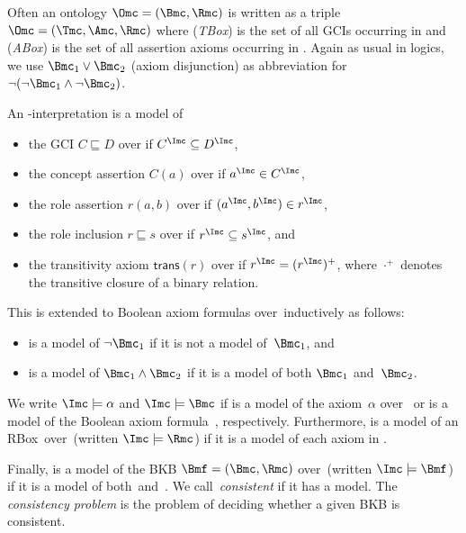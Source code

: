 Often an ontology $\Omc = (\Bmc, \Rmc)$ is written as a triple $\Omc = (\Tmc, \Amc, \Rmc)$ where
\Tmc (\emph{TBox}) is the set of all GCIs occurring in \Bmc and \Amc (\emph{ABox}) is the set of all
assertion axioms occurring in \Bmc.  Again as usual in logics, we use $\Bmc_1\lor\Bmc_2$ (axiom
disjunction) as abbreviation for $\lnot(\lnot\Bmc_1\land\lnot\Bmc_2)$.

\begin{definition}
  An \Nsig-interpretation \I is a model of
  \begin{itemize}
  \item the GCI $C \sqsubseteq D$ over \Nsig if $C^{\I} \subseteq D^{\I}$,
  \item the concept assertion $C(a)$ over \Nsig if $a^{\I} \in C^{\I}$,
  \item the role assertion $r(a,b)$ over \Nsig if $(a^\I,b^\I)\in r^\I$,
  \item the role inclusion $r \sqsubseteq s$ over \Nsig if $r^\I \subseteq s^\I$, and
  \item the transitivity axiom $\mathsf{trans}(r)$ over \Nsig if $r^\I=(r^\I)^+$, where $\cdot^{+}$
    denotes the transitive closure of a binary relation.
  \end{itemize}

  This is extended to Boolean axiom formulas over~\Nsig inductively as follows:
  \begin{itemize}
  \item \I is a model of $\lnot\B_1$ if it is not a model of~$\B_1$, and
  \item \I is a model of $\B_1\land\B_2$ if it is a model of both $\B_1$ and~$\B_2$.
  \end{itemize}

  We write $\I\models\alpha$ and $\I\models\Bmc$ if \I is a model of the axiom~$\alpha$ over~\Nsig
  or \I is a model of the Boolean axiom formula~\B, respectively. Furthermore, \I is a model of an
  RBox~\Rmc over~\Nsig (written $\I\models\Rmc$) if it is a model of each axiom in \Rmc.

  Finally, \I is a model of the BKB $\Bmf=(\B,\Rmc)$ over~\Nsig (written $\I\models\Bmf$) if it is a
  model of both~\B and~\Rmc.  We call~\Bmf \emph{consistent} if it has a model.  The
  \emph{consistency problem} is the problem of deciding whether a given BKB is consistent.
\end{definition}


